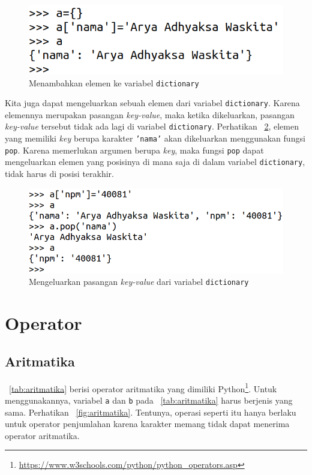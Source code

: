 \begin{figure}[h!]
  \begin{center}
    \includegraphics[scale=1.25]{pics/dictionary.png}
    \caption{Menambahkan elemen ke variabel \texttt{dictionary}}
    \label{fig:dict}
  \end{center}
\end{figure}

Kita juga dapat mengeluarkan sebuah elemen dari variabel \texttt{dictionary}. Karena elemennya merupakan pasangan \textit{key-value}, maka ketika dikeluarkan, pasangan \textit{key-value} tersebut tidak ada lagi di variabel \texttt{dictionary}. Perhatikan \figurename~\ref{fig:popDict}, elemen yang memiliki \textit{key} berupa karakter \texttt{'nama'} akan dikeluarkan menggunakan fungsi \texttt{pop}. Karena memerlukan argumen berupa \textit{key}, maka fungsi \texttt{pop} dapat mengeluarkan elemen yang posisinya di mana saja di dalam variabel \texttt{dictionary}, tidak harus di posisi terakhir.  

\begin{figure}
  \begin{center}
    \includegraphics[scale=1.25]{pics/popDict.png}
    \caption{Mengeluarkan pasangan \textit{key-value} dari variabel \texttt{dictionary}}
    \label{fig:popDict}
  \end{center}
\end{figure}

\section{Operator}
\subsection{Aritmatika}
\tablename~\ref{tab:aritmatika} berisi operator aritmatika yang dimiliki Python\footnote{\url{https://www.w3schools.com/python/python_operators.asp}}. Untuk menggunakannya, variabel \texttt{a} dan \texttt{b} pada \tablename~\ref{tab:aritmatika} harus berjenis yang sama. Perhatikan \figurename~\ref{fig:aritmatika}. Tentunya, operasi seperti itu hanya berlaku untuk operator penjumlahan karena karakter memang tidak dapat menerima operator aritmatika.

